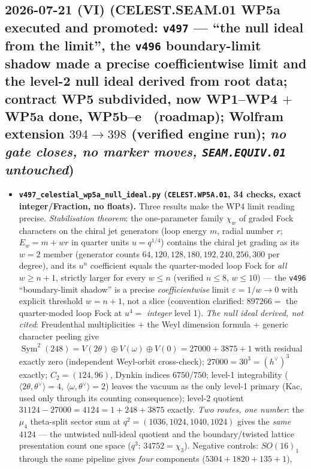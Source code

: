 \subsection*{2026-07-21 (VI) (CELEST.SEAM.01 WP5a executed and promoted: \texttt{v497} --- ``the null ideal from the limit'', the \texttt{v496} boundary-limit shadow made a precise coefficientwise limit and the level-2 null ideal derived from root data; contract WP5 subdivided, now WP1--WP4 $+$ WP5a done, WP5b--e \mO\ (roadmap); Wolfram extension $394\to398$ (verified engine run); \emph{no gate closes, no marker moves, \texttt{SEAM.EQUIV.01} untouched})}
\begin{itemize}[leftmargin=1.5em]
\item \textbf{\texttt{v497\_celestial\_wp5a\_null\_ideal.py} (\texttt{CELEST.WP5A.01}, 34 checks, exact
integer/Fraction, no floats).} Three results make the WP4 limit reading precise. \emph{Stabilisation
theorem}: the one-parameter family $\chi_w$ of graded Fock characters on the chiral jet generators
(loop energy $m$, radial number $r$; $E_w=m+wr$ in quarter units $u=q^{1/4}$) contains the chiral jet
grading as its $w{=}2$ member (generator counts $64,120,128,180,192,240,256,300$ per degree), and its
$u^n$ coefficient equals the quarter-moded loop Fock for \emph{all} $w\ge n{+}1$, strictly larger for
every $w\le n$ (verified $n\le8$, $w\le10$) --- the \texttt{v496} ``boundary-limit shadow'' is a
precise \emph{coefficientwise} limit $\varepsilon=1/w\to0$ with explicit threshold $w=n{+}1$, not a
slice (convention clarified: $897266=$ the quarter-moded loop Fock at $u^4=$ \emph{integer} level 1).
\emph{The null ideal derived, not cited}: Freudenthal multiplicities $+$ the Weyl dimension formula $+$
generic character peeling give $\operatorname{Sym}^2(248)=V(2\theta)\oplus V(\omega)\oplus
V(0)=27000+3875+1$ with residual exactly zero (independent Weyl-orbit cross-check);
$27000=30^3=(h^\vee)^3$ exactly; $C_2=(124,96)$, Dynkin indices $6750/750$; level-1 integrability
($\langle2\theta,\theta^\vee\rangle=4$, $\langle\omega,\theta^\vee\rangle=2$) leaves the vacuum as the
only level-1 primary (Kac, used only through its counting consequence); level-2 quotient
$31124-27000=4124=1+248+3875$ exactly. \emph{Two routes, one number}: the $\mu_4$ theta-split sector
sum at $q^2=(1036,1024,1040,1024)$ gives the \emph{same} $4124$ --- the untwisted null-ideal quotient
and the boundary/twisted lattice presentation count one space ($q^3$: $34752=\chi_3$). Negative
controls: $SO(16)_1$ through the same pipeline gives \emph{four} components ($5304+1820+135+1$),

\end{itemize}
